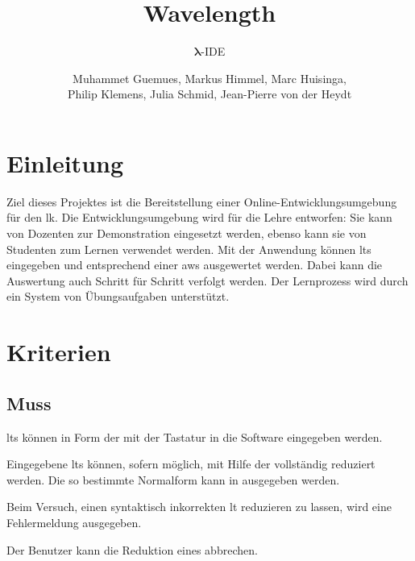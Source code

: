 \documentclass[parskip=full,11pt,twoside]{scrartcl}
\title{Wavelength}
\subtitle{$\bm{\lambda}$-IDE}
\author{Muhammet Guemues, Markus Himmel, Marc Huisinga,\\Philip Klemens, Julia Schmid, Jean-Pierre von der Heydt}
\begin{document}
\maketitle
\pagebreak

\tableofcontents
\pagebreak

\section{Einleitung}
Ziel dieses Projektes ist die Bereitstellung einer Online-Entwicklungsumgebung für den \gls{lk}. 
Die Entwicklungsumgebung wird für die Lehre entworfen: 
Sie kann von Dozenten zur Demonstration eingesetzt werden, ebenso kann sie von Studenten zum Lernen verwendet werden.
Mit der Anwendung können \glspl{lt} eingegeben und entsprechend einer \gls{aws} ausgewertet werden.
Dabei kann die Auswertung auch Schritt für Schritt verfolgt werden.
Der Lernprozess wird durch ein System von Übungsaufgaben unterstützt.

\pagebreak
\section{Kriterien}

\subsection{Muss}

\glspl{lt} können in Form der 
mit der Tastatur in die Software eingegeben werden.

Eingegebene \glspl{lt} können, sofern möglich, mit Hilfe der  vollständig
reduziert werden. Die so bestimmte Normalform kann in 
ausgegeben werden.

Beim Versuch, einen syntaktisch inkorrekten \gls{lt} reduzieren zu lassen, wird eine
Fehlermeldung ausgegeben.

Der Benutzer kann die Reduktion eines  abbrechen.

\end{document}

